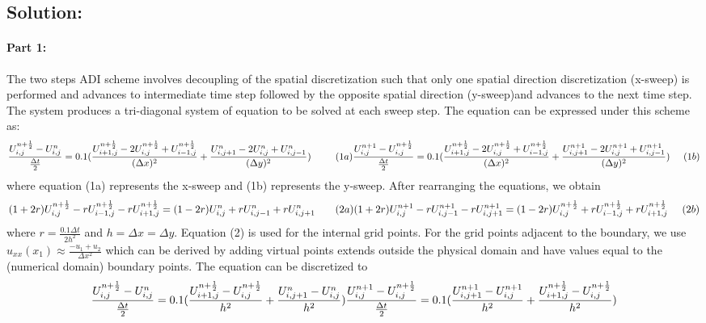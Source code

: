 \subsection{Solution:} 
\paragraph{Part 1:}
The two steps ADI scheme involves decoupling of the spatial  discretization such that only one spatial direction discretization (x-sweep) is performed and advances to intermediate time step followed by the opposite spatial direction (y-sweep)and advances to the next time step. The system produces a tri-diagonal system of equation to be solved at each sweep step. The equation can be expressed under this scheme as:
$$
\frac{U_{i,j}^{n+\frac{1}{2}} - U_{i,j}^{n}}{\frac{\Delta t}{2}} = 0.1 (\frac{U_{i+1,j}^{n+\frac{1}{2}} -2U_{i,j}^{n+\frac{1}{2}} +U_{i-1,j}^{n+\frac{1}{2}}}{(\Delta x)^2} + \frac{U_{i,j+1}^{n}-2U_{i,j}^{n}+U_{i,j-1}^{n}}{(\Delta y)^2}) \;\;\;\;\;\;\;\;\; (1a)
\\
\frac{U_{i,j}^{n+1} - U_{i,j}^{n+\frac{1}{2}}}{\frac{\Delta t}{2}} = 0.1 (\frac{U_{i+1,j}^{n+\frac{1}{2}} -2U_{i,j}^{n+\frac{1}{2}} + U_{i-1,j}^{n+\frac{1}{2}}}{(\Delta x)^2} + \frac{U_{i,j+1}^{n+1}-2U_{i,j}^{n+1}+U_{i,j-1}^{n+1}}{(\Delta y)^2}) \;\;\;\;\; (1b)
$$
where equation (1a) represents the x-sweep and (1b) represents the y-sweep. After rearranging the equations, we obtain
$$
(1+2r)U_{i,j}^{n+\frac{1}{2}} - rU_{i-1,j}^{n+\frac{1}{2}} - rU_{i+1,j}^{n+\frac{1}{2}} =
(1-2r)U_{i,j}^{n}  + rU_{i,j-1}^{n}+ rU_{i,j+1}^{n} \;\;\;\;\;\;\;(2a) 
\\
(1+2r)U_{i,j}^{n+1} - rU_{i,j-1}^{n+1} - rU_{i,j+1}^{n+1} =
(1-2r)U_{i,j}^{n+\frac{1}{2}} + rU_{i-1,j}^{n+\frac{1}{2}} + rU_{i+1,j}^{n+\frac{1}{2}} \;\;\;\;\; (2b) 
$$
where $r=\frac{0.1\Delta t}{2h^2}$ and $h=\Delta x= \Delta y$. Equation (2) is used for the internal grid points. For the grid points adjacent to the boundary, we use $u_{xx}(x_{1}) \approx \frac{-u_{1}+u_{2}}{\Delta x^{2}}$ which can be derived by adding virtual points extends outside the physical domain and have values equal to the (numerical domain) boundary points. The equation can be discretized to
$$
\frac{U_{i,j}^{n+\frac{1}{2}}-U_{i,j}^{n}}{\frac{\Delta t}{2}} = 0.1(\frac{U_{i+1,j}^{n+\frac{1}{2}} - U_{i,j}^{n+\frac{1}{2}}}{h^{2}} + \frac{U_{i,j+1}^{n}-U_{i,j}^{n}}{h^{2}} )
\\
\frac{U_{i,j}^{n+1}-U_{i,j}^{n+\frac{1}{2}}}{\frac{\Delta t}{2}} = 0.1(\frac{U_{i,j+1}^{n+1} - U_{i,j}^{n+1}}{h^{2}} + \frac{U_{i+1,j}^{n+\frac{1}{2}} - U_{i,j}^{n+\frac{1}{2}}}{h^{2}} )
$$
